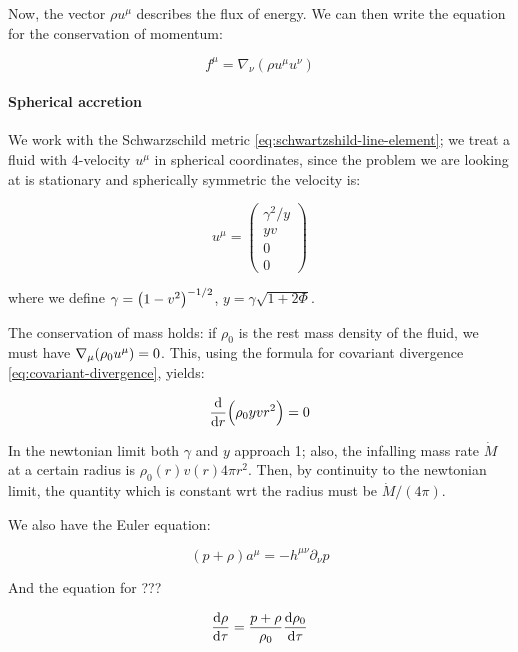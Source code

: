 Now, the vector $\rho u^\mu$ describes the flux of energy.
We can then write the equation for the conservation of momentum:

\begin{equation}
    f^\mu = \nabla_\nu (\rho u^\mu u^\nu)
\end{equation}

\paragraph{Spherical accretion}

We work with the Schwarzschild metric \eqref{eq:schwartzshild-line-element}; we treat a fluid with 4-velocity $u^\mu$ in spherical coordinates, since the problem we are looking at is stationary and spherically symmetric the velocity is:

\begin{equation}
    u^\mu = \begin{pmatrix}
        \gamma^2 / y\\
        yv\\
        0\\
        0
    \end{pmatrix}
\end{equation}

where we define $\gamma = \qty(1-v^2)^{-1/2}$, $y=\gamma \sqrt{1+2\Phi}$.

The conservation of mass holds: if $\rho_0$ is the rest mass density of the fluid, we must have $\nabla_\mu \qty(\rho_0 u^\mu) =0$. This, using the formula for covariant divergence \eqref{eq:covariant-divergence}, yields:

\begin{equation}
    \dv{}{r} \qty(\rho_0 yvr^2) = 0
\end{equation}

In the newtonian limit both $\gamma$ and $y$ approach 1; also, the infalling mass rate $\Dot{M}$ at a certain radius is $\rho_0 (r) v(r) 4\pi r^2$. Then, by continuity to the newtonian limit, the quantity which is constant wrt the radius must be $\Dot{M} / (4\pi)$.

We also have the Euler equation:

\begin{equation}
    (p+\rho) a^\mu = - h^{\mu \nu} \partial_\nu p
\end{equation}

And the equation for ???

\begin{equation}
    \dv{\rho}{\tau} = \frac{p+\rho}{\rho_0} \dv{\rho_0}{\tau}
\end{equation}


